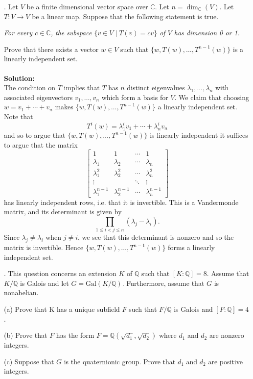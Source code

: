 \documentclass[11pt]{article}
\newcommand{\Q}{\mathbb{Q}}
\newcommand{\C}{\mathbb{C}}
\begin{document}
. Let $V$ be a finite dimensional vector space over $\C$. Let $n = \dim_\C(V )$. Let
$T : V \to V$ be a linear map. Suppose that the following statement is true.

\emph{For every $c \in\C$, the subspace $\{v\in V\mid T(v) = cv\}$ of $V$ has dimension 0 or 1.}

Prove that there exists a vector $w \in V$ such that $\{w, T(w), \ldots, T^{n-1}
(w)\}$ is a linearly
independent set.\\\\\textbf{Solution:}\\
The condition on $T$ implies that $T$ has $n$ distinct eigenvalues $\lambda_1,\ldots, \lambda_n$ with associated eigenvectors $v_1,\ldots, v_n$ which form a basis for $V$. We claim that choosing $w = v_1+\cdots +v_n$ makes $\{w,T(w),\ldots, T^{n-1}(w)\}$ a linearly independent set. Note that \[
T^i(w) = \lambda_1^i v_1 + \cdots + \lambda_n^i v_n
\]
and so to argue that $\{w,T(w),\ldots, T^{n-1}(w)\}$ is linearly independent it suffices to argue that the matrix \[
\begin{bmatrix}
1 & 1 &\cdots & 1\\
\lambda_1 & \lambda_2 & \cdots & \lambda_n \\
\lambda_1^2 & \lambda_2^2 &\cdots & \lambda_n^2\\
\vdots &&\ddots & \vdots \\
\lambda_1^{n-1} & \lambda_2^{n-1} & \cdots & \lambda_n^{n-1}
\end{bmatrix}
\]
has linearly independent rows, i.e. that it is invertible. 
This is a Vandermonde matrix, and its determinant is given by \[
\prod_{1\le i< j \le n} (\lambda_j-\lambda_i).
\]
Since $\lambda_j \neq \lambda_i$ when $j\neq i$, we see that this determinant is nonzero and so the matrix is invertible. Hence $\{w,T(w),\ldots, T^{n-1}(w)\}$ forms a linearly independent set. 

. This question concerns an extension $K$ of $\Q$ such that $[K :\Q] = 8$. Assume
that $K/\Q$ is Galois and let $G = \mbox{Gal}(K/\Q)$. Furthermore, assume that $G$ is nonabelian.

(a) Prove that K has a unique subfield $F$ such that $F/\Q$ is Galois and $[F : \Q] = 4$.

(b) Prove that $F$ has the form $F =\Q(\sqrt{d_1},\sqrt{d_2})$ where $d_1$ and $d_2$ are nonzero integers.

(c) Suppose that $G$ is the quaternionic group. Prove that $d_1$ and $d_2$ are positive integers.\\
\end{document}
